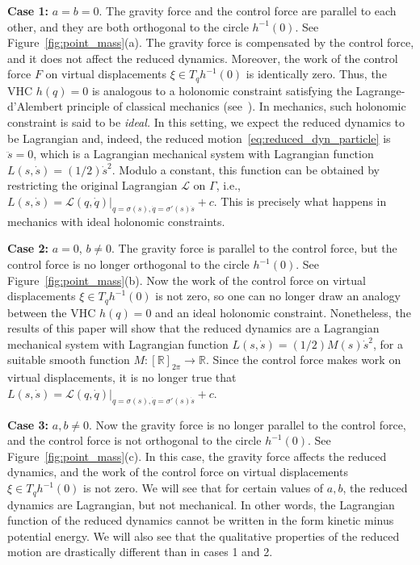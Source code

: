 {\bf Case 1:} $a=b=0$. The gravity force and the control force are
parallel to each other, and they are both orthogonal to the circle
$h^{-1}(0)$. See Figure~\ref{fig:point_mass}(a). The gravity force is
compensated by the control force, and it does not affect the reduced
dynamics.  Moreover, the work of the control force $F$ on virtual
displacements $\xi \in T_q h^{-1}(0)$ is identically zero.  Thus, the
VHC $h(q)=0$ is analogous to a holonomic constraint satisfying the
Lagrange-d'Alembert principle of classical mechanics
(see~\cite{ArnoldClassicalMech}). In mechanics, such holonomic
constraint is said to be {\em ideal.} In this setting, we expect the
reduced dynamics to be Lagrangian and, indeed, the reduced
motion~\eqref{eq:reduced_dyn_particle} is $\ddot s=0$, which is a
Lagrangian mechanical system with Lagrangian function $L(s,\dot s) =
(1/2) \dot s^2$. Modulo a constant, this function can be obtained by
restricting the original Lagrangian $\mathcal{L}$ on $\Gamma$, i.e., $L(s,\dot
s) = \mathcal{L}(q,\dot q)\big|_{q=\sigma(s),\dot q=\sigma'(s)\dot s} +
c$. This is precisely what happens in mechanics with ideal holonomic
constraints.

{\bf Case 2:} $a=0$, $b\neq 0$.  The gravity force is parallel
to the control force, but the control force is no longer orthogonal to
the circle $h^{-1}(0)$. See Figure~\ref{fig:point_mass}(b). Now the
work of the control force on virtual displacements $\xi \in T_q
h^{-1}(0)$ is not zero, so one can no longer draw an analogy between
the VHC $h(q)=0$ and an ideal holonomic constraint.  Nonetheless, the
results of this paper will show that the reduced dynamics are a
Lagrangian mechanical system with Lagrangian function $L(s,\dot s) =
(1/2) M(s)\dot s^2$, for a suitable smooth function $M : [\mathbb{R}]_{2\pi}
\to \mathbb{R}$. Since the control force makes work on virtual displacements,
it is no longer true that $L(s,\dot s) = \mathcal{L}(q,\dot
q)\big|_{q=\sigma(s),\dot q=\sigma'(s)\dot s} + c$.

{\bf Case 3:} $a,b \neq 0$. Now the gravity force is no
longer parallel to the control force, and the control force is not
orthogonal to the circle $h^{-1}(0)$.  See
Figure~\ref{fig:point_mass}(c). In this case, the gravity force
affects the reduced dynamics, and the work of the control force on
virtual displacements $\xi \in T_q h^{-1}(0)$ is not zero.  We will
see that for certain values of $a,b$, the reduced dynamics are
Lagrangian, but not mechanical. In other words, the Lagrangian
function of the reduced dynamics cannot be written in the form kinetic
minus potential energy. We will also see that the qualitative
properties of the reduced motion are drastically different than in
cases 1 and 2.

